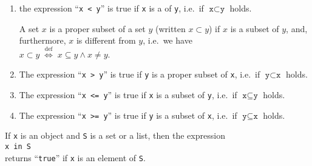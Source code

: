 \begin{enumerate}
\item the expression ``\texttt{x < y}'' is true if \texttt{x} is a  of \texttt{y}, 
      i.e.~if $\texttt{x} \subset \texttt{y}$ holds.

      A set $x$ is a proper subset of a set $y$ (written $x \subset y$) if $x$ is a subset of $y$, and,
      furthermore, $x$ is different from $y$, i.e.~we have
      \\[0.2cm]
      \hspace*{1.3cm}
      $x \subset y \;\stackrel{\mathrm{def}}{\Longleftrightarrow}\; x \subseteq y \wedge x \not= y$. 
\item The expression ``\texttt{x > y}'' is true if \texttt{y} is a proper subset of \texttt{x},
      i.e.~if $\texttt{y} \subset \texttt{x}$ holds.
\item The expression ``\texttt{x <= y}'' is true if \texttt{x} is a subset of \texttt{y},
      i.e.~if $\texttt{x} \subseteq \texttt{y}$ holds.
\item The expression ``\texttt{x >= y}'' is true if \texttt{y} is a subset of \texttt{x},
      i.e.~if $\texttt{y} \subseteq \texttt{x}$ holds.
\end{enumerate}
If \texttt{x} is an object and \texttt{S} is a set or a list, then the expression
\\[0.2cm]
\hspace*{1.3cm}
\texttt{x in S}
\\[0.2cm]
returns ``\texttt{true}'' if \texttt{x} is an element of \texttt{S}.

